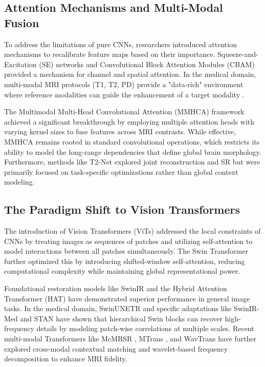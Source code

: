 \subsection{Attention Mechanisms and Multi-Modal Fusion}
To address the limitations of pure CNNs, researchers introduced attention mechanisms to recalibrate feature maps based on their importance. Squeeze-and-Excitation (SE) networks \cite{seran} and Convolutional Block Attention Modules (CBAM) provided a mechanism for channel and spatial attention. In the medical domain, multi-modal MRI protocols (T1, T2, PD) provide a "data-rich" environment where reference modalities can guide the enhancement of a target modality \cite{fscwrn, csn}.

The Multimodal Multi-Head Convolutional Attention (MMHCA) framework \cite{Georgescu2023} achieved a significant breakthrough by employing multiple attention heads with varying kernel sizes to fuse features across MRI contrasts. While effective, MMHCA remains rooted in standard convolutional operations, which restricts its ability to model the long-range dependencies that define global brain morphology. Furthermore, methods like T2-Net \cite{t2net} explored joint reconstruction and SR but were primarily focused on task-specific optimizations rather than global context modeling.

\subsection{The Paradigm Shift to Vision Transformers}
The introduction of Vision Transformers (ViTs) \cite{Sajol2024, tpami_survey} addressed the local constraints of CNNs by treating images as sequences of patches and utilizing self-attention to model interactions between all patches simultaneously. The Swin Transformer \cite{swin_trans} further optimized this by introducing shifted-window self-attention, reducing computational complexity while maintaining global representational power.

Foundational restoration models like SwinIR \cite{swinir} and the Hybrid Attention Transformer (HAT) \cite{hat} have demonstrated superior performance in general image tasks. In the medical domain, SwinUNETR \cite{SwinUNETR2025} and specific adaptations like SwinIR-Med \cite{swinir_med} and STAN \cite{med_sr_survey} have shown that hierarchical Swin blocks can recover high-frequency details by modeling patch-wise correlations at multiple scales. Recent multi-modal Transformers like McMRSR \cite{mcmrsr_plus}, MTrans \cite{mtrans}, and WavTrans \cite{wavtrans} have further explored cross-modal contextual matching and wavelet-based frequency decomposition to enhance MRI fidelity.


